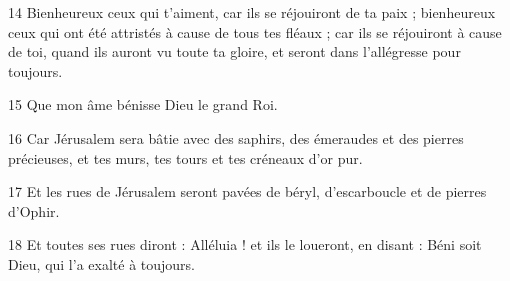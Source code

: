\par 14 Bienheureux ceux qui t'aiment, car ils se réjouiront de ta paix ; bienheureux ceux qui ont été attristés à cause de tous tes fléaux ; car ils se réjouiront à cause de toi, quand ils auront vu toute ta gloire, et seront dans l'allégresse pour toujours.
\par 15 Que mon âme bénisse Dieu le grand Roi.
\par 16 Car Jérusalem sera bâtie avec des saphirs, des émeraudes et des pierres précieuses, et tes murs, tes tours et tes créneaux d'or pur.
\par 17 Et les rues de Jérusalem seront pavées de béryl, d'escarboucle et de pierres d'Ophir.
\par 18 Et toutes ses rues diront : Alléluia ! et ils le loueront, en disant : Béni soit Dieu, qui l'a exalté à toujours.


